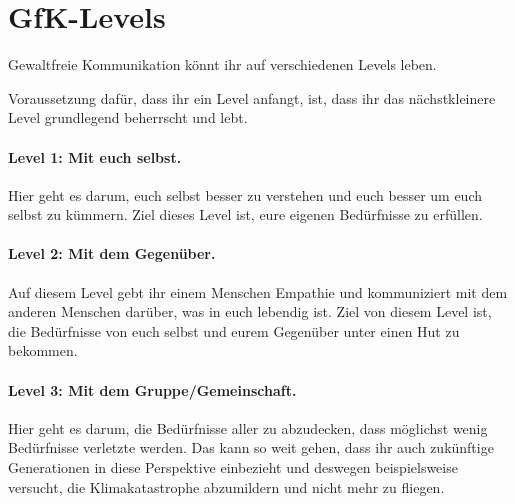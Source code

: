 \section{GfK-Levels}
\label{gfk-levels}

Gewaltfreie Kommunikation könnt ihr auf verschiedenen Levels leben.

Voraussetzung dafür, dass ihr ein Level anfangt, ist, dass ihr das nächstkleinere Level grundlegend beherrscht und lebt.

\paragraph{Level 1: Mit euch selbst.} Hier geht es darum, euch selbst besser zu verstehen und euch besser um euch selbst zu kümmern. Ziel dieses Level ist, eure eigenen Bedürfnisse zu erfüllen.

\paragraph{Level 2: Mit dem Gegenüber.} Auf diesem Level gebt ihr einem Menschen Empathie und kommuniziert mit dem anderen Menschen darüber, was in euch lebendig ist. Ziel von diesem Level ist, die Bedürfnisse von euch selbst und eurem Gegenüber unter einen Hut zu bekommen.

\paragraph{Level 3: Mit dem Gruppe/Gemeinschaft.} Hier geht es darum, die Bedürfnisse aller zu abzudecken, dass möglichst wenig Bedürfnisse verletzte werden. Das kann so weit gehen, dass ihr auch zukünftige Generationen in diese Perspektive einbezieht und deswegen beispielsweise versucht, die Klimakatastrophe abzumildern und nicht mehr zu fliegen.
